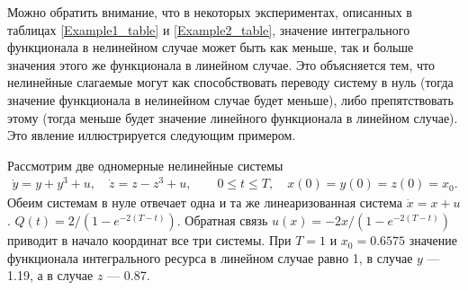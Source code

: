 \documentclass[../main.tex]{subfiles}
\begin{document}
Можно обратить внимание, что в некоторых экспериментах, описанных в таблицах \ref{Example1_table} и \ref{Example2_table}, значение интегрального функционала в нелинейном случае может быть как меньше, так и больше значения этого же функционала в линейном случае. Это объясняется тем, что нелинейные слагаемые могут как способствовать переводу систему в нуль (тогда значение функционала в нелинейном случае будет меньше), либо препятствовать этому (тогда меньше будет значение линейного функционала в линейном случае). Это явление иллюстрируется следующим примером.

\begin{pr}
 Рассмотрим две одномерные нелинейные системы
 \begin{gather*}
    \dot{y} = y + y^3 + u, \quad 
    \dot{z} = z - z^3 + u, \qquad
    0 \leqslant t \leqslant T, \quad
    x(0) = y(0) = z(0) = x_0. 
\end{gather*}
Обеим системам в нуле отвечает одна и та же линеаризованная система $ \dot{x} = x + u$. $ Q(t) = 2/(1 - e^{-2(T-t)})$. Обратная связь $ u(x) = -2x/(1 - e^{-2(T-t)})$ приводит в начало координат все три системы. При $T = 1$ и $x_0 = 0.6575$ значение функционала интегрального ресурса в линейном случае равно 1, в случае $y$ --- 1.19, а в случае $z$ --- 0.87. 
\end{pr}
\end{document}
